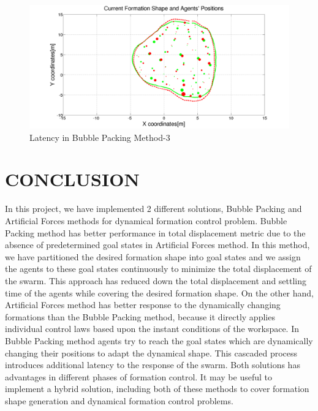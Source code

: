 \documentclass[letterpaper, 10 pt, conference]{ieeeconf}  %
\begin{document}
\begin{figure}[thpb]
\caption{Latency in Bubble Packing Method-3} \label{combo3_ref}
\centerline{\includegraphics[scale = 0.17]{combo3}}
\end{figure}

\section{CONCLUSION}
In this project, we have implemented 2 different solutions, Bubble Packing and Artificial Forces methods for dynamical formation control problem. Bubble Packing method has better performance in total displacement metric due to the absence of predetermined goal states in Artificial Forces method. In this method, we have partitioned the desired formation shape into goal states and we assign the agents to these goal states continuously to minimize the total displacement of the swarm. This approach has reduced down the total displacement and settling time of the agents while covering the desired formation shape.
On the other hand, Artificial Forces method has better response to the dynamically changing formations than the Bubble Packing method, because it directly applies individual control laws based upon the instant conditions of the workspace. In Bubble Packing method agents try to reach the goal states which are dynamically changing their positions to adapt the dynamical shape. This cascaded process introduces additional latency to the response of the swarm. Both solutions has advantages in different phases of formation control. It may be useful to implement a hybrid solution, including both of these methods to cover formation shape generation and dynamical formation control problems. 




%

\end{document}

